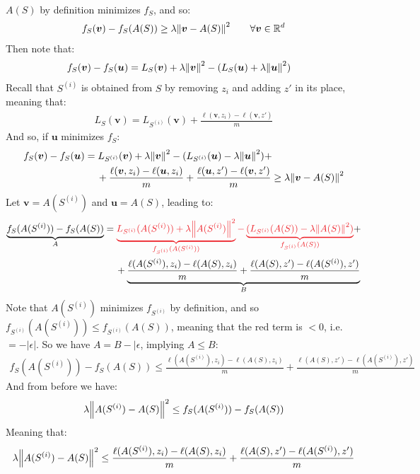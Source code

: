 \documentclass[../template.tex]{subfiles}
\begin{document}
\begin{itemize}
\begin{align*}
    \end{align*}
    $A(S)$ by definition minimizes $f_S$, and so:
    \begin{align*}
        f_S(\bm{v}) - f_S(A(S)) \geq \lambda \norm{\bm{v} - A(S)}^2 \qquad \forall \bm{v} \in \mathbb{R}^d
    \end{align*}
    Then note that:
    \begin{align*}
        f_S(\bm{v}) - f_S(\bm{u}) &= L_S(\bm{v}) + \lambda\norm{\bm{v}}^2 - (L_S(\bm{u}) + \lambda \norm{\bm{u}}^2)
    \end{align*}
    Recall that $S^{(i)}$ is obtained from $S$ by removing $z_i$ and adding $z'$ in its place, meaning that:
    \begin{align*}
        L_S(\bm{v}) = L_{S^{(i)}}(\bm{v}) + \frac{\ell (\bm{v}, z_i) - \ell(\bm{v}, z')}{m} 
    \end{align*}
    And so, if $\bm{u}$ minimizes $f_S$:
    \begin{align*}
        f_S(\bm{v}) - f_S(\bm{u}) &= L_{S^{(i)}}(\bm{v}) + \lambda\norm{\bm{v}}^2 - (L_{S^{(i)}}(\bm{u}) - \lambda \norm{\bm{u}}^2) +\\
        &\quad \>  +\frac{\ell(\bm{v}, z_i) - \ell(\bm{u}, z_i)}{m} + \frac{\ell(\bm{u}, z') - \ell(\bm{v}, z')}{m}  \geq \lambda \norm{\bm{v} - A(S)}^2
    \end{align*}
    Let $\bm{v} = A(S^{(i)})$ and $\bm{u} = A(S)$, leading to:
    \begin{align*}
        \underbrace{f_S(A(S^{(i)})) - f_S(A(S))}_{A} &= \textcolor{Red}{\underbrace{L_{S^{(i)}}(A(S^{(i)})) + \lambda\norm{A(S^{(i)})}^2}_{f_{S^{(i)}}(A(S^{(i)}))} -\underbrace{ (L_{S^{(i)}}(A(S)) - \lambda \norm{A(S)}^2)}_{f_{S^{(i)}}(A(S))}}  +\\
        &\quad \>  +\underbrace{\frac{\ell(A(S^{(i)}), z_i) - \ell(A(S), z_i)}{m} + \frac{\ell(A(S), z') - \ell(A(S^{(i)}), z')}{m}}_{B} 
    \end{align*}
    Note that $A(S^{(i)})$ minimizes $f_{S^{(i)}}$ by definition, and so $f_{S^{(i)}}(A(S^{(i)})) \leq f_{S^{(i)}}(A(S))$, meaning that the red term is $<0$, i.e. $=-|\epsilon|$. So we have $A = B - |\epsilon$, implying $A \leq B$:
    \begin{align*}
        f_S(A(S^{(i)})) - f_S(A(S)) \leq\frac{\ell(A(S^{(i)}), z_i) - \ell(A(S), z_i)}{m} + \frac{\ell(A(S), z') - \ell(A(S^{(i)}), z')}{m}  
    \end{align*}
    And from before we have:
    \begin{align*}
       \lambda \norm{A(S^{(i)}) - A(S)}^2 \leq f_S(A(S^{(i)})) - f_S(A(S))
    \end{align*}
    Meaning that:
    \begin{align}
        \lambda \norm{A(S^{(i)}) - A(S)}^2 \leq\frac{\ell(A(S^{(i)}), z_i) - \ell(A(S), z_i)}{m} + \frac{\ell(A(S), z') - \ell(A(S^{(i)}), z')}{m}  \label{eqn:ineq1}
    \end{align}


\end{itemize}
\end{document}

